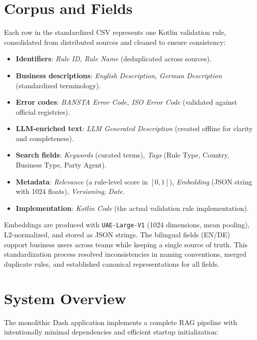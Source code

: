 \section{Corpus and Fields}
Each row in the standardized CSV represents one Kotlin validation rule, consolidated from distributed sources and cleaned to ensure consistency:
\begin{itemize}[leftmargin=*,itemsep=2pt,topsep=2pt]
 \item \textbf{Identifiers}: \textit{Rule ID, Rule Name} (deduplicated across sources).
 \item \textbf{Business descriptions}: \textit{English Description, German Description} (standardized terminology).
 \item \textbf{Error codes}: \textit{BANSTA Error Code, ISO Error Code} (validated against official registries).
 \item \textbf{LLM-enriched text}: \textit{LLM Generated Description} (created offline for clarity and completeness).
 \item \textbf{Search fields}: \textit{Keywords} (curated terms), \textit{Tags} (Rule Type, Country, Business Type, Party Agent).
 \item \textbf{Metadata}: \textit{Relevance} (a rule-level score in $[0,1]$), \textit{Embedding} (JSON string with 1024 floats), \textit{Versioning}, \textit{Date}.
 \item \textbf{Implementation}: \textit{Kotlin Code} (the actual validation rule implementation).
\end{itemize}
Embeddings are produced with \texttt{UAE-Large-V1} (1024 dimensions, mean pooling), L2-normalized, and stored as JSON strings. The bilingual fields (EN/DE) support business users across teams while keeping a single source of truth. This standardization process resolved inconsistencies in naming conventions, merged duplicate rules, and established canonical representations for all fields.

\section{System Overview}
The monolithic Dash application implements a complete RAG pipeline with intentionally minimal dependencies and efficient startup initialization:

